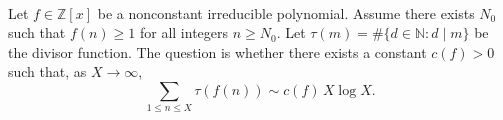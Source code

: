 \\
Let $f\in\mathbb{Z}[x]$ be a nonconstant irreducible polynomial.
Assume there exists $N_0$ such that $f(n)\ge 1$ for all integers $n\ge N_0$.
Let $\tau(m)=\#\{d\in\mathbb{N}: d\mid m\}$ be the divisor function.
The question is whether there exists a constant $c(f)>0$ such that, as $X\to\infty$,
\[
\sum_{1\le n\le X} \tau(f(n)) \sim c(f)\,X\log X.
\]
